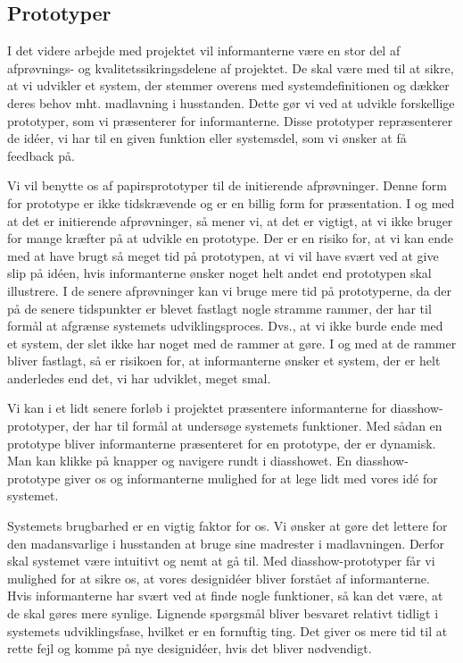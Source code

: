 \subsection{Prototyper}
\label{subsec:prototyper}

I det videre arbejde med projektet vil informanterne være en stor del af afprøvnings- og kvalitetssikringsdelene af projektet. De skal være med til at sikre, at vi udvikler et system, der stemmer overens med systemdefinitionen og dækker deres behov mht. madlavning i husstanden. Dette gør vi ved at udvikle forskellige prototyper, som vi præsenterer for informanterne. Disse prototyper repræsenterer de idéer, vi har til en given funktion eller systemsdel, som vi ønsker at få feedback på.

Vi vil benytte os af papirsprototyper til de initierende afprøvninger. Denne form for prototype er ikke tidskrævende og er en billig form for præsentation. I og med at det er initierende afprøvninger, så mener vi, at det er vigtigt, at vi ikke bruger for mange kræfter på at udvikle en prototype. Der er en risiko for, at vi kan ende med at have brugt så meget tid på prototypen, at vi vil have svært ved at give slip på idéen, hvis informanterne ønsker noget helt andet end prototypen skal illustrere. I de senere afprøvninger kan vi bruge mere tid på prototyperne, da der på de senere tidspunkter er blevet fastlagt nogle stramme rammer, der har til formål at afgrænse systemets udviklingsproces. Dvs., at vi ikke burde ende med et system, der slet ikke har noget med de rammer at gøre. I og med at de rammer bliver fastlagt, så er risikoen for, at informanterne ønsker et system, der er helt anderledes end det, vi har udviklet, meget smal.

Vi kan i et lidt senere forløb i projektet præsentere informanterne for diasshow-prototyper, der har til formål at undersøge systemets funktioner. Med sådan en prototype bliver informanterne præsenteret for en prototype, der er dynamisk. Man kan klikke på knapper og navigere rundt i diasshowet. En diasshow-prototype giver os og informanterne mulighed for at lege lidt med vores idé for systemet. 

Systemets brugbarhed er en vigtig faktor for os. Vi ønsker at gøre det lettere for den madansvarlige i husstanden at bruge sine madrester i madlavningen. Derfor skal systemet være intuitivt og nemt at gå til. Med diasshow-prototyper får vi mulighed for at sikre os, at vores designidéer bliver forstået af informanterne. Hvis informanterne \fx har svært ved at finde nogle funktioner, så kan det være, at de skal gøres mere synlige. Lignende spørgsmål bliver besvaret relativt tidligt i systemets udviklingsfase, hvilket er en fornuftig ting. Det giver os mere tid til at rette fejl og komme på nye designidéer, hvis det bliver nødvendigt.

